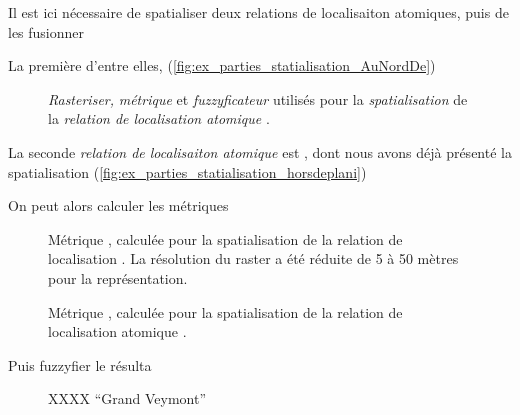 Il est ici nécessaire de spatialiser deux relations de localisaiton
atomiques, puis de les fusionner

La première d'entre elles, 
(\autoref{fig:ex_parties_statialisation_AuNordDe})

\begin{figure}
  \centering
  
  \caption{\emph{Rasteriser,} \emph{métrique} et \emph{fuzzyficateur}
    utilisés pour la \emph{spatialisation} de la \emph{relation de
      localisation atomique} \protect{}.}
  \label{fig:ex_parties_statialisation_AuNordDe}
\end{figure}

La seconde \emph{relation de localisaiton atomique} est
, dont nous avons déjà
présenté la spatialisation
(\autoref{fig:ex_parties_statialisation_horsdeplani})

On peut alors calculer les métriques

\begin{figure}
  \centering
  
  \caption{Métrique \protect{}, calculée
    pour la spatialisation de la relation de localisation
    \protect{}. La résolution du raster a
    été réduite de 5 à 50 mètres pour la représentation.}
  \label{fig:veyont_EcartNord}
\end{figure}

\begin{figure}
  \centering
  
  \caption{Métrique \protect{}, calculée pour la
    spatialisation de la relation de localisation atomique
    \protect{}.}
  \label{fig:veyont_distance}
\end{figure}

Puis fuzzyfier le résulta

%   


\begin{figure}
  \centering
  
  \caption{XXXX \enquote{Grand Veymont}}
  \label{fig:fuzzy_veyont_angleNord}
\end{figure}


